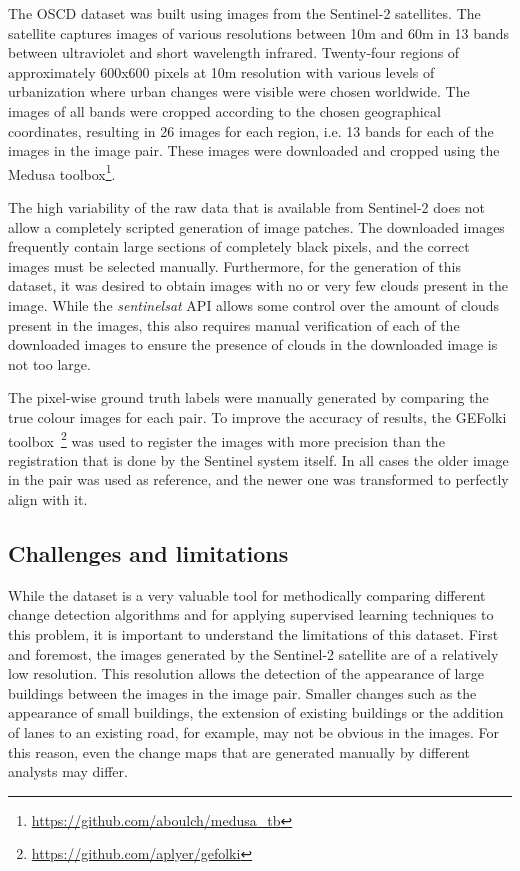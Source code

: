 \documentclass{article}
\begin{document}
The OSCD dataset was built using images from the Sentinel-2 satellites. The satellite captures images of various resolutions between 10m and 60m in 13 bands between ultraviolet and short wavelength infrared. Twenty-four regions of approximately 600x600 pixels at 10m resolution with various levels of urbanization where urban changes were visible were chosen worldwide. The images of all bands were cropped according to the chosen geographical coordinates, resulting in 26 images for each region, i.e. 13 bands for each of the images in the image pair.
These images were downloaded and cropped using the Medusa toolbox\footnote{\url{https://github.com/aboulch/medusa_tb}}.


The high variability of the raw data that is available from Sentinel-2 does not allow a completely scripted generation of image patches. The downloaded images frequently contain large sections of completely black pixels, and the correct images must be selected manually. Furthermore, for the generation of this dataset, it was desired to obtain images with no or very few clouds present in the image. While the \textit{sentinelsat} API allows some control over the amount of clouds present in the images, this also requires manual verification of each of the downloaded images to ensure the presence of clouds in the downloaded image is not too large.

The pixel-wise ground truth labels were manually generated by comparing the true colour images for each pair. To improve the accuracy of results, the GEFolki toolbox~\cite{brigot2016adaptation}\footnote{\url{https://github.com/aplyer/gefolki}} was used to register the images with more precision than the registration that is done by the Sentinel system itself. In all cases the older image in the pair was used as reference, and the newer one was transformed to perfectly align with it.


\subsection{Challenges and limitations}
\label{ssec:ds-challenges}

While the dataset is a very valuable tool for methodically comparing different change detection algorithms and for applying supervised learning techniques to this problem, it is important to understand the limitations of this dataset. First and foremost, the images generated by the Sentinel-2 satellite are of a relatively low resolution. This resolution allows the detection of the appearance of large buildings between the images in the image pair. Smaller changes such as the appearance of small buildings, the extension of existing buildings or the addition of lanes to an existing road, for example, may not be obvious in the images. For this reason, even the change maps that are generated manually by different analysts may differ.
\end{document}

